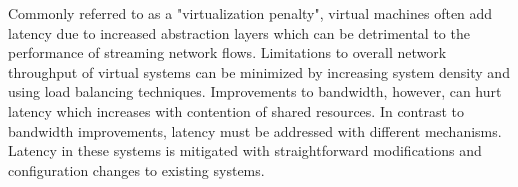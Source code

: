 Commonly referred to as a "virtualization penalty", virtual machines often add latency due to increased abstraction layers which can be detrimental to the performance of streaming network flows.
Limitations to overall network throughput of virtual systems can be minimized by increasing system density and using load balancing techniques.
Improvements to bandwidth, however, can hurt latency which increases with contention of shared resources.
In contrast to bandwidth improvements, latency must be addressed with different mechanisms.
Latency in these systems is mitigated with straightforward modifications and configuration changes to existing systems.

